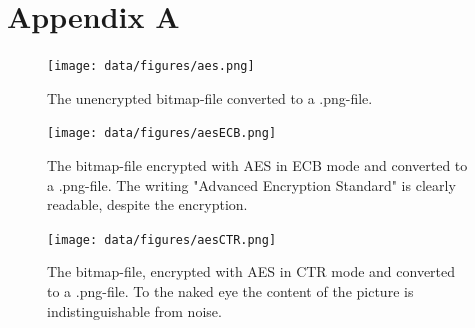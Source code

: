 \chapter{Appendix A}
\label{ch:appendixa}

 \begin{figure}
\centering
\texttt{[image: data/figures/aes.png]} 
\caption{The unencrypted bitmap-file converted to a .png-file.}
\label{fig:aespng}
\end{figure}

\begin{figure}
\centering
\texttt{[image: data/figures/aesECB.png]} 
\caption{The bitmap-file encrypted with AES in ECB mode and converted to a .png-file. The writing "Advanced Encryption Standard" is clearly readable, despite the encryption.}
\label{fig:aesecbpng}
\end{figure}

\begin{figure}
\centering
\texttt{[image: data/figures/aesCTR.png]} 
\caption{The bitmap-file, encrypted with AES in CTR mode and converted to a .png-file. To the naked eye the content of the picture is indistinguishable from noise.}
\label{fig:aesctrpng}
\end{figure}



